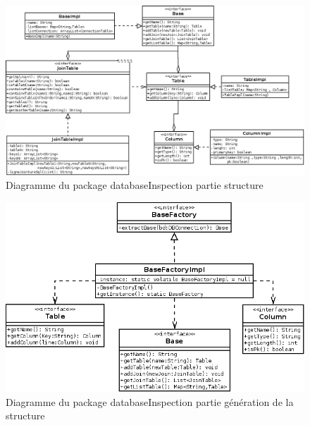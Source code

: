 \documentclass[12pt]{report}
\begin{document}
\begin{figure}[h!]
\begin{center}
\includegraphics[scale=0.4]{bduml/structDataBase.png}
\caption{Diagramme du package databaseInspection partie structure}
\end{center}
\end{figure}

\begin{figure}[h!]
\begin{center}
\includegraphics[scale=0.5]{bduml/baseFactory.png}
\caption{Diagramme du package databaseInspection partie génération de la structure}
\end{center}
\end{figure}
\end{document}

